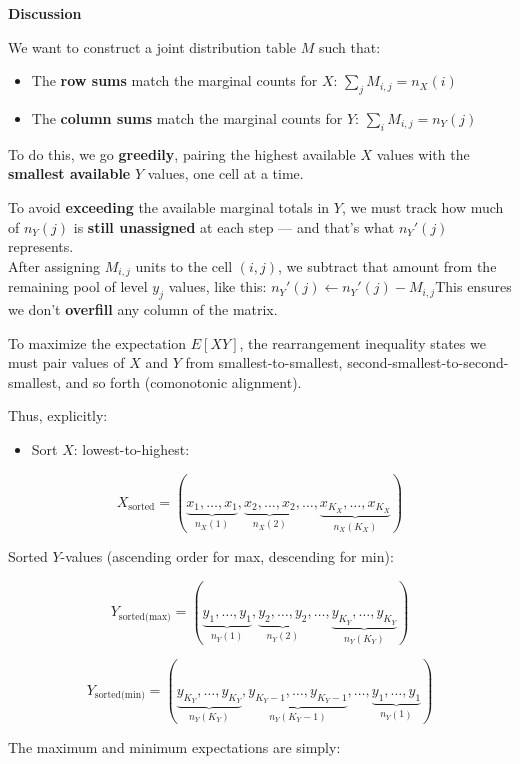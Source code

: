 \documentclass[
  12pt,
]{article}
\providecommand{\tightlist}{%
  \setlength{\itemsep}{0pt}\setlength{\parskip}{0pt}}\usepackage{longtable,booktabs,array}
\begin{document}
\textbf{Discussion}

We want to construct a joint distribution table \(M\) such that:

\begin{itemize}
\item
  The \textbf{row sums} match the marginal counts for \(X\):
  \(\sum_j M_{i,j} = n_X(i)\)
\item
  The \textbf{column sums} match the marginal counts for \(Y\):
  \(\sum_i M_{i,j} = n_Y(j)\)
\end{itemize}

To do this, we go \textbf{greedily}, pairing the highest available \(X\)
values with the \textbf{smallest available} \(Y\) values, one cell at a
time.

To avoid \textbf{exceeding} the available marginal totals in \(Y\), we
must track how much of \(n_Y(j)\) is \textbf{still unassigned} at each
step --- and that's what \(n_Y'(j)\) represents.\\
After assigning \(M_{i,j}\) units to the cell \((i,j)\), we subtract
that amount from the remaining pool of level \(y_j\) values, like this:
\(n_Y'(j) \leftarrow n_Y'(j) - M_{i,j}\)This ensures we don't
\textbf{overfill} any column of the matrix.

To maximize the expectation \(E[XY]\), the rearrangement inequality
states we must pair values of \(X\) and \(Y\) from smallest-to-smallest,
second-smallest-to-second-smallest, and so forth (comonotonic
alignment).

Thus, explicitly:

\begin{itemize}
\tightlist
\item
  Sort \(X\): lowest-to-highest:
\end{itemize}

\[X_{\text{sorted}} = (\underbrace{x_1,\dots,x_1}_{n_X(1)}, \underbrace{x_2,\dots,x_2}_{n_X(2)}, \dots,\underbrace{x_{K_X},\dots,x_{K_X}}_{n_X(K_X)})\]

Sorted \(Y\)-values (ascending order for max, descending for min):

\[Y_{\text{sorted(max)}} = (\underbrace{y_1,\dots,y_1}_{n_Y(1)}, \underbrace{y_2,\dots,y_2}_{n_Y(2)}, \dots,\underbrace{y_{K_Y},\dots,y_{K_Y}}_{n_Y(K_Y)})\]

\[Y_{\text{sorted(min)}} = (\underbrace{y_{K_Y},\dots,y_{K_Y}}_{n_Y(K_Y)}, \underbrace{y_{K_Y-1},\dots,y_{K_Y-1}}_{n_Y(K_Y-1)}, \dots,\underbrace{y_1,\dots,y_1}_{n_Y(1)})\]

The maximum and minimum expectations are simply:
\end{document}
